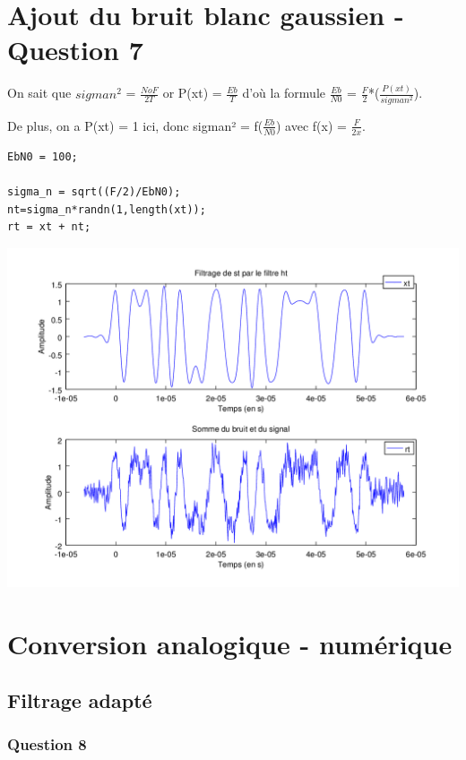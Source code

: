 \documentclass{acm_proc_article-sp}
\begin{document}
\begin{center}
\begin{center}
\section{Ajout du bruit blanc gaussien - Question 7}


On sait que $sigman^{2}$ = $\frac{NoF}{2T}$
or P(xt) = $\frac{Eb}{T}$ d'où la formule $\frac{Eb}{N0}$ = $\frac{F}{2}$*($\frac{P(xt)}{sigman^{2}}$).

De plus, on a P(xt) = 1 ici, donc sigman² = f($\frac{Eb}{N0}$) avec f(x) = $\frac{F}{2x}$.

\begin{center}
\begin{lstlisting}
EbN0 = 100;

sigma_n = sqrt((F/2)/EbN0);
nt=sigma_n*randn(1,length(xt));
rt = xt + nt;
\end{lstlisting}

\includegraphics[scale=0.45]{signalBruite_7.png}
\end{center}


\section{Conversion analogique - numérique}
\subsection{Filtrage adapté}
\subsubsection{Question 8}


\end{center}
\end{center}
\end{document}
